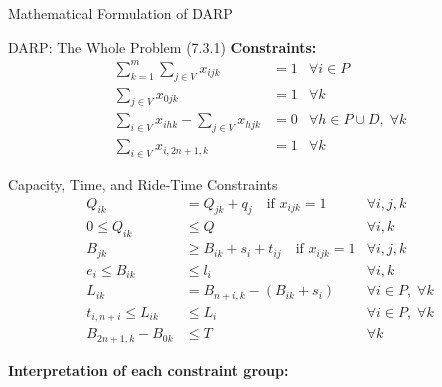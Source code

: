 \documentclass[aspectratio=169,10pt]{beamer}
\begin{document}
\begin{frame}[allowframebreaks]{Mathematical Formulation of DARP}
\begin{block}{DARP: The Whole Problem (7.3.1)}
    \medskip
    \textbf{Constraints:}
    \begin{align}
      \sum_{k=1}^{m} \sum_{j \in V} x_{ijk} &= 1
        & \forall i \in P \tag{C1} \\
      \sum_{j \in V} x_{0jk} &= 1
        & \forall k \tag{C2} \\
      \sum_{i \in V} x_{ihk} - \sum_{j \in V} x_{hjk} &= 0
        & \forall h \in P \cup D,\; \forall k \tag{C3} \\
      \sum_{i \in V} x_{i,2n+1,k} &= 1
        & \forall k \tag{C4}
    \end{align}
  \end{block}

  \framebreak

  \begin{block}{Capacity, Time, and Ride-Time Constraints}
    \begin{align}
      Q_{ik} &= Q_{jk} + q_j \quad\text{if } x_{ijk}=1
        & \forall i,j,k \tag{C5} \\
      0 \leq Q_{ik} &\leq Q
        & \forall i,k \tag{C6} \\
      B_{jk} &\geq B_{ik} + s_i + t_{ij} \quad\text{if } x_{ijk}=1
        & \forall i,j,k \tag{C7} \\
      e_i \leq B_{ik} &\leq l_i
        & \forall i,k \tag{C8} \\
      L_{ik} &= B_{n+i,k} - (B_{ik} + s_i)
        & \forall i \in P, \; \forall k \tag{C9} \\
      t_{i,n+i} \leq L_{ik} &\leq L_i
        & \forall i \in P, \; \forall k \tag{C10} \\
      B_{2n+1,k} - B_{0k} &\leq T
        & \forall k \tag{C11}
    \end{align}
  \end{block}

  \framebreak

  \textbf{Interpretation of each constraint group:}


\end{frame}
\end{document}
